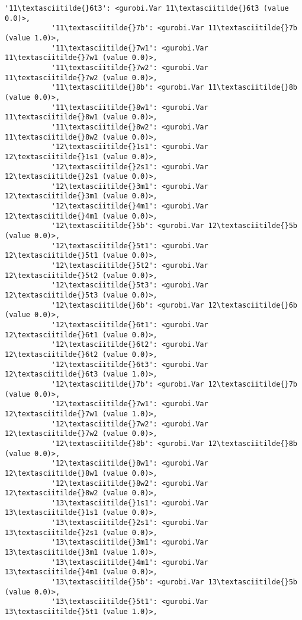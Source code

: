 \documentclass[11pt]{article}
\begin{document}
\begin{Verbatim}[commandchars=\\\{\}]
           '11\textasciitilde{}6t3': <gurobi.Var 11\textasciitilde{}6t3 (value 0.0)>,
           '11\textasciitilde{}7b': <gurobi.Var 11\textasciitilde{}7b (value 1.0)>,
           '11\textasciitilde{}7w1': <gurobi.Var 11\textasciitilde{}7w1 (value 0.0)>,
           '11\textasciitilde{}7w2': <gurobi.Var 11\textasciitilde{}7w2 (value 0.0)>,
           '11\textasciitilde{}8b': <gurobi.Var 11\textasciitilde{}8b (value 0.0)>,
           '11\textasciitilde{}8w1': <gurobi.Var 11\textasciitilde{}8w1 (value 0.0)>,
           '11\textasciitilde{}8w2': <gurobi.Var 11\textasciitilde{}8w2 (value 0.0)>,
           '12\textasciitilde{}1s1': <gurobi.Var 12\textasciitilde{}1s1 (value 0.0)>,
           '12\textasciitilde{}2s1': <gurobi.Var 12\textasciitilde{}2s1 (value 0.0)>,
           '12\textasciitilde{}3m1': <gurobi.Var 12\textasciitilde{}3m1 (value 0.0)>,
           '12\textasciitilde{}4m1': <gurobi.Var 12\textasciitilde{}4m1 (value 0.0)>,
           '12\textasciitilde{}5b': <gurobi.Var 12\textasciitilde{}5b (value 0.0)>,
           '12\textasciitilde{}5t1': <gurobi.Var 12\textasciitilde{}5t1 (value 0.0)>,
           '12\textasciitilde{}5t2': <gurobi.Var 12\textasciitilde{}5t2 (value 0.0)>,
           '12\textasciitilde{}5t3': <gurobi.Var 12\textasciitilde{}5t3 (value 0.0)>,
           '12\textasciitilde{}6b': <gurobi.Var 12\textasciitilde{}6b (value 0.0)>,
           '12\textasciitilde{}6t1': <gurobi.Var 12\textasciitilde{}6t1 (value 0.0)>,
           '12\textasciitilde{}6t2': <gurobi.Var 12\textasciitilde{}6t2 (value 0.0)>,
           '12\textasciitilde{}6t3': <gurobi.Var 12\textasciitilde{}6t3 (value 1.0)>,
           '12\textasciitilde{}7b': <gurobi.Var 12\textasciitilde{}7b (value 0.0)>,
           '12\textasciitilde{}7w1': <gurobi.Var 12\textasciitilde{}7w1 (value 1.0)>,
           '12\textasciitilde{}7w2': <gurobi.Var 12\textasciitilde{}7w2 (value 0.0)>,
           '12\textasciitilde{}8b': <gurobi.Var 12\textasciitilde{}8b (value 0.0)>,
           '12\textasciitilde{}8w1': <gurobi.Var 12\textasciitilde{}8w1 (value 0.0)>,
           '12\textasciitilde{}8w2': <gurobi.Var 12\textasciitilde{}8w2 (value 0.0)>,
           '13\textasciitilde{}1s1': <gurobi.Var 13\textasciitilde{}1s1 (value 0.0)>,
           '13\textasciitilde{}2s1': <gurobi.Var 13\textasciitilde{}2s1 (value 0.0)>,
           '13\textasciitilde{}3m1': <gurobi.Var 13\textasciitilde{}3m1 (value 1.0)>,
           '13\textasciitilde{}4m1': <gurobi.Var 13\textasciitilde{}4m1 (value 0.0)>,
           '13\textasciitilde{}5b': <gurobi.Var 13\textasciitilde{}5b (value 0.0)>,
           '13\textasciitilde{}5t1': <gurobi.Var 13\textasciitilde{}5t1 (value 1.0)>,

\end{Verbatim}
\end{document}
